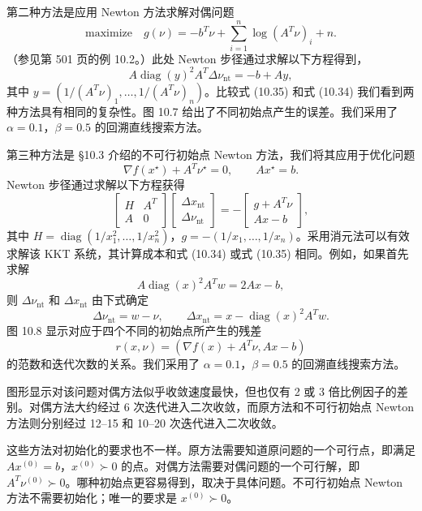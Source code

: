 \documentclass[UTF8,12pt,a4paper,fontset=fandol]{ctexart}
\begin{document}
第二种方法是应用 Newton 方法求解对偶问题
\[
\mbox{maximize}\quad g(\nu)=-b^T\nu+\sum_{i=1}^n\log(A^T\nu)_i+n.
\]
（参见第 501 页的例 10.2。）此处 Newton 步径通过求解以下方程得到，
\begin{equation}
A\operatorname{diag}(y)^2A^T\Delta\nu_{\mathrm{nt}}=-b+Ay,
\tag{10.35}
\end{equation}
其中 $y=(1/(A^T\nu)_1,\ldots,1/(A^T\nu)_n)$。比较式 (10.35) 和式 (10.34) 我们看到两种方法具有相同的复杂性。图 10.7 给出了不同初始点产生的误差。我们采用了 $\alpha=0.1$，$\beta=0.5$ 的回溯直线搜索方法。

第三种方法是 \S10.3 介绍的不可行初始点 Newton 方法，我们将其应用于优化问题
\[
\nabla f(x^\star)+A^T\nu^\star=0,\qquad Ax^\star=b.
\]
Newton 步径通过求解以下方程获得
\[
\begin{bmatrix}
H&A^T\\
A&0
\end{bmatrix}
\begin{bmatrix}
\Delta x_{\mathrm{nt}}\\
\Delta\nu_{\mathrm{nt}}
\end{bmatrix}
=-
\begin{bmatrix}
g+A^T\nu\\
Ax-b
\end{bmatrix},
\]
其中 $H=\operatorname{diag}(1/x_1^2,\ldots,1/x_n^2)$，$g=-(1/x_1,\ldots,1/x_n)$。采用消元法可以有效求解该 KKT 系统，其计算成本和式 (10.34) 或式 (10.35) 相同。例如，如果首先求解
\[
A\operatorname{diag}(x)^2A^Tw=2Ax-b,
\]
则 $\Delta\nu_{\mathrm{nt}}$ 和 $\Delta x_{\mathrm{nt}}$ 由下式确定
\[
\Delta\nu_{\mathrm{nt}}=w-\nu,\qquad
\Delta x_{\mathrm{nt}}=x-\operatorname{diag}(x)^2A^Tw.
\]
图 10.8 显示对应于四个不同的初始点所产生的残差
\[
r(x,\nu)=(\nabla f(x)+A^T\nu,Ax-b)
\]
的范数和迭代次数的关系。我们采用了 $\alpha=0.1$，$\beta=0.5$ 的回溯直线搜索方法。

图形显示对该问题对偶方法似乎收敛速度最快，但也仅有 2 或 3 倍比例因子的差别。对偶方法大约经过 6 次迭代进入二次收敛，而原方法和不可行初始点 Newton 方法则分别经过 12--15 和 10--20 次迭代进入二次收敛。

这些方法对初始化的要求也不一样。原方法需要知道原问题的一个可行点，即满足 $Ax^{(0)}=b$，$x^{(0)}\succ0$ 的点。对偶方法需要对偶问题的一个可行解，即 $A^T\nu^{(0)}\succ0$。哪种初始点更容易得到，取决于具体问题。不可行初始点 Newton 方法不需要初始化；唯一的要求是 $x^{(0)}\succ0$。
\end{document}

